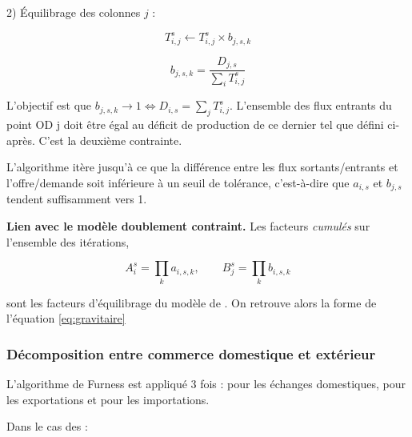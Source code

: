 \documentclass[12pt,a4paper,french]{report}
\begin{document}
	2) Équilibrage des colonnes $j$ :
	
	\begin{equation}
		T_{i,j}^s \leftarrow  T_{i,j}^s \times b_{j,s,k} 
	\end{equation}
	
	\begin{equation}
		b_{j,s,k} = \frac{D_{j,s}}{\sum_i T_{i,j}^s}
	\end{equation}
	
	L'objectif est que $b_{j,s,k} \to 1 \iff D_{i,s} = \sum_j T_{i,j}^s$. L'ensemble des flux entrants du point OD j doit être égal au déficit de production de ce dernier tel que défini ci-après. C'est la deuxième contrainte.
	\medskip
	
	L'algorithme itère jusqu'à ce que la différence entre les flux sortants/entrants et l'offre/demande soit inférieure à un seuil de tolérance, c'est-à-dire que $a_{i,s}$ et $b_{j,s}$ tendent suffisamment vers 1.
	
	\textbf{Lien avec le modèle doublement contraint.} Les facteurs
	\emph{cumulés} sur l'ensemble des itérations,
	
	\begin{equation}
		A_i^s = \prod_k a_{i,s,k},
		\qquad
		B_j^s = \prod_k b_{i,s,k}
	\end{equation}
	
	sont les facteurs d'équilibrage du modèle de \cite{Wilson1967}. On retrouve alors la forme de l'équation \ref{eq:gravitaire}
	
	
	\subsubsection{Décomposition entre commerce domestique et extérieur}
	\label{subsubsec:decompo_comex}
	
	L'algorithme de Furness est appliqué 3 fois : pour les échanges domestiques, pour les exportations et pour les importations.
	
	Dans le cas des :
	
\end{document}
